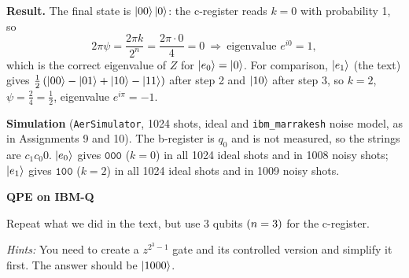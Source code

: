 \documentclass[a4paper, 10pt]{article}
\begin{document}
\begin{solution}
	\noindent \textbf{Result.} The final state is \( \ket{00}\ket{0} \): the c-register reads \( k = 0 \) with probability 1, so
	\[
		2\pi\psi = \frac{2\pi k}{2^n} = \frac{2\pi \cdot 0}{4} = 0 \ \Rightarrow\ \text{eigenvalue } e^{i0} = 1,
	\]
	which is the correct eigenvalue of \( Z \) for \( \ket{e_0} = \ket{0} \).
	For comparison, \( \ket{e_1} \) (the text) gives \( \frac{1}{2}\left(\ket{00} - \ket{01} + \ket{10} - \ket{11}\right) \) after step 2 and \( \ket{10} \) after step 3, so \( k = 2 \), \( \psi = \frac{2}{4} = \frac{1}{2} \), eigenvalue \( e^{i\pi} = -1 \).

	\myspace

	\noindent \textbf{Simulation} (\texttt{AerSimulator}, 1024 shots, ideal and \texttt{ibm\_marrakesh} noise model, as in Assignments 9 and 10). The b-register is \( q_0 \) and is not measured, so the strings are \( c_1c_0 0 \).
	\noindent \( \ket{e_0} \) gives \( \texttt{000} \) (\( k = 0 \)) in all 1024 ideal shots and in 1008 noisy shots; \( \ket{e_1} \) gives \( \texttt{100} \) (\( k = 2 \)) in all 1024 ideal shots and in 1009 noisy shots.
\end{solution}

\begin{problem}
\textbf{QPE on IBM-Q}
\par Repeat what we did in the text, but use 3 qubits \( \left(n = 3\right) \) for the c-register.
\par\noindent \textit{Hints:} You need to create a \( z^{2^3 - 1} \) gate
and its controlled version and simplify it first.
The answer should be \( \ket{1000} \).
\end{problem}
\end{document}
